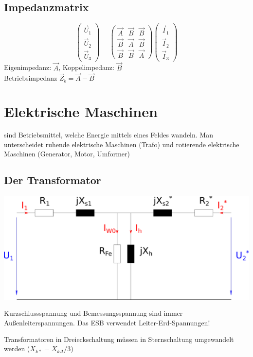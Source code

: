 \documentclass[european]{latex4ei_sheet}
\begin{document}
	\subsection{Impedanzmatrix}
	\[\begin{pmatrix} \vec U_1 \\ \vec U_2 \\ \vec U_3 \end{pmatrix} = 
		\begin{pmatrix} \vec A & \vec B & \vec B \\ \vec B & \vec A & \vec B \\ \vec B & \vec B & \vec A \end{pmatrix} 
		\begin{pmatrix} \vec I_1 \\ \vec I_2 \\ \vec I_3 \end{pmatrix}\]
		Eigenimpedanz: $\vec A$, Koppelimpedanz: $\vec B$\\
		Betriebsimpedanz $\vec Z_b = \vec A - \vec B$

	\section{Elektrische Maschinen}
	sind Betriebsmittel, welche Energie mittels eines Feldes wandeln. Man unterscheidet ruhende elektrische Maschinen (Trafo) und rotierende elektrische Maschinen (Generator, Motor, Umformer)
		\subsection{Der Transformator}
		
		\includegraphics[scale=.2]{./img/ersatzschaltbild_transformator.pdf} \\
		\begin{symbolbox}
			Kurzschlussspannung und Bemessungsspannung sind immer Außenleiterspannungen. Das ESB verwendet Leiter-Erd-Spannungen!
		\end{symbolbox}
		Transformatoren in Dreieckschaltung müssen in Sternschaltung umgewandelt werden ($X_{k*} = X_{k\Delta}/3$)\\
\end{document}
